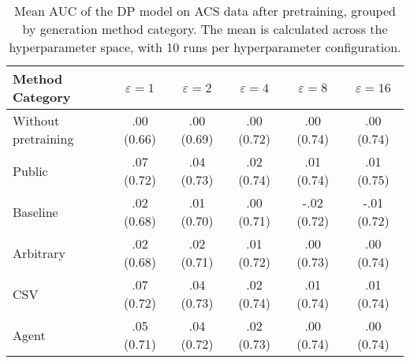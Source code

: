 \begin{table}[h!]
    \centering
    \caption{Mean AUC of the DP model on ACS data after pretraining, grouped by generation method category. The mean is calculated across the hyperparameter space, with 10 runs per hyperparameter configuration.}
    \label{tab:epsilon_comparison}
    \begin{tabular}{lccccc}
    \toprule
    Method Category & $\varepsilon=1$ & $\varepsilon=2$ & $\varepsilon=4$ & $\varepsilon=8$ & $\varepsilon=16$ \\
    \midrule
    Without pretraining & .00 {\small (0.66)} & .00 {\small (0.69)} & .00 {\small (0.72)} & .00 {\small (0.74)} & .00 {\small (0.74)} \\
    \arrayrulecolor{black!50!}\midrule
    Public & \cellcolor{silver!30}.07 {\small (0.72)} & \cellcolor{gold!30}.04 {\small (0.73)} & \cellcolor{gold!30}.02 {\small (0.74)} & \cellcolor{gold!30}.01 {\small (0.74)} & \cellcolor{gold!30}.01 {\small (0.75)} \\
    \arrayrulecolor{black!50!}\midrule
    Baseline & .02 {\small (0.68)} & .01 {\small (0.70)} & .00 {\small (0.71)} & -.02 {\small (0.72)} & -.01 {\small (0.72)} \\
    \arrayrulecolor{black!50!}\midrule
    Arbitrary & .02 {\small (0.68)} & \cellcolor{bronze!30}.02 {\small (0.71)} & .01 {\small (0.72)} & .00 {\small (0.73)} & .00 {\small (0.74)} \\
    \arrayrulecolor{black!50!}\midrule
    CSV & \cellcolor{gold!30}.07 {\small (0.72)} & \cellcolor{gold!30}.04 {\small (0.73)} & \cellcolor{silver!30}.02 {\small (0.74)} & \cellcolor{silver!30}.01 {\small (0.74)} & \cellcolor{silver!30}.01 {\small (0.74)} \\
    Agent & \cellcolor{bronze!30}.05 {\small (0.71)} & \cellcolor{silver!30}.04 {\small (0.72)} & \cellcolor{bronze!30}.02 {\small (0.73)} & \cellcolor{bronze!30}.00 {\small (0.74)} & \cellcolor{bronze!30}.00 {\small (0.74)} \\
    \bottomrule
    \end{tabular}
\end{table}